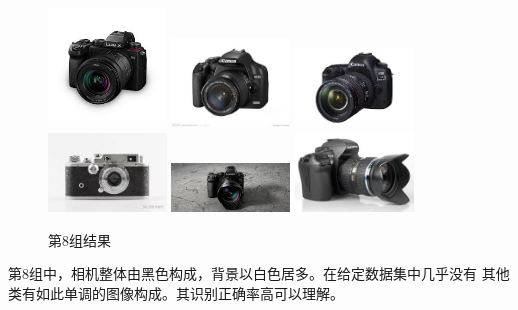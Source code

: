 \documentclass{article}
\begin{document}
\begin{figure}[h]
\centering
\includegraphics[width=0.28\textwidth]{./CNN/target/8camera}
\includegraphics[width=0.28\textwidth]{./CNN/dataset/41}
\includegraphics[width=0.28\textwidth]{./CNN/dataset/44}
\includegraphics[width=0.28\textwidth]{./CNN/dataset/45}
\includegraphics[width=0.28\textwidth]{./CNN/dataset/43}
\includegraphics[width=0.28\textwidth]{./CNN/dataset/42}
\caption{第8组结果}
\end{figure}

    第8组中，相机整体由黑色构成，背景以白色居多。在给定数据集中几乎没有
    其他类有如此单调的图像构成。其识别正确率高可以理解。
\end{document}
